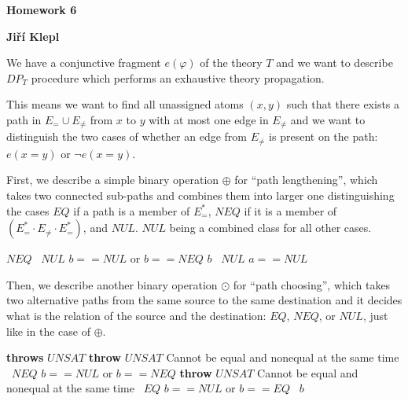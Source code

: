 \documentclass[a4paper,12pt]{article} %
\begin{document}
\begin{center}
    {\Large \bf Homework 6}
    \vspace{2mm}

    {\bf Jiří Klepl}

\end{center}

\vspace{0.4cm}

We have a conjunctive fragment $e(\varphi)$ of the theory $T$ and we want to describe $DP_T$ procedure which performs an exhaustive theory propagation.

This means we want to find all unassigned atoms $(x, y)$ such that there exists a path in $E_= \cup E_{\neq}$ from $x$ to $y$ with at most one edge in $E_{\neq}$ and we want to distinguish the two cases of whether an edge from $E_{\neq}$ is present on the path: $e(x = y)$ or $\neg e(x = y)$.

First, we describe a simple binary operation $\oplus$ for ``path lengthening'', which takes two connected sub-paths and combines them into larger one distinguishing the cases $EQ$ if a path is a member of $E_=^*$, $NEQ$ if it is a member of $(E_=^* \cdot E_{\neq} \cdot E_=^*)$, and $NUL$. $NUL$ being a combined class for all other cases.

\begin{algorithmic}[1]
            \Return $NEQ$
        \Else
            \ \Return $NUL$ \Comment $b == NUL$ or $b == NEQ$ 
        \EndIf
        \Return $b$
    \Else
        \ \Return $NUL$ \Comment $a == NUL$ 
    \EndIf
    \EndFunction
\end{algorithmic}

Then, we describe another binary operation $\odot$ for ``path choosing'', which takes two alternative paths from the same source to the same destination and it decides what is the relation of the source and the destination: $EQ$, $NEQ$, or $NUL$, just like in the case of $\oplus$.

\begin{algorithmic}[1]
     \textbf{throws} $UNSAT$
            \State \textbf{throw} $UNSAT$ \Comment Cannot be equal and nonequal at the same time
        \Else
            \ \Return $NEQ$ \Comment $b == NUL$ or $b == NEQ$ 
        \EndIf
            \State \textbf{throw} $UNSAT$ \Comment Cannot be equal and nonequal at the same time
        \Else
            \ \Return $EQ$ \Comment $b == NUL$ or $b == EQ$ 
        \EndIf
    \Else
        \ \Return $b$
    \EndIf
    \EndFunction
\end{algorithmic}
\end{document}

